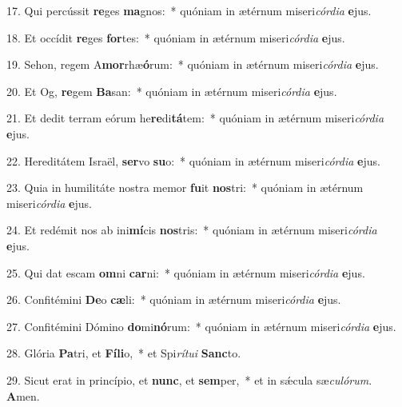 17. Qui percússit \textbf{re}ges \textbf{ma}gnos:~*  quóniam in ætérnum miseri\textit{cór}\textit{di}\textit{a} \textbf{e}jus.\

18. Et occídit \textbf{re}ges \textbf{for}tes:~*  quóniam in ætérnum miseri\textit{cór}\textit{di}\textit{a} \textbf{e}jus.\

19. Sehon, regem A\textbf{mor}rhæ\textbf{ó}rum:~*  quóniam in ætérnum miseri\textit{cór}\textit{di}\textit{a} \textbf{e}jus.\

20. Et Og, \textbf{re}gem \textbf{Ba}san:~*  quóniam in ætérnum miseri\textit{cór}\textit{di}\textit{a} \textbf{e}jus.\

21. Et dedit terram eórum he\textbf{re}di\textbf{tá}tem:~*  quóniam in ætérnum miseri\textit{cór}\textit{di}\textit{a} \textbf{e}jus.\

22. Hereditátem Israël, \textbf{ser}vo \textbf{su}o:~*  quóniam in ætérnum miseri\textit{cór}\textit{di}\textit{a} \textbf{e}jus.\

23. Quia in humilitáte nostra memor \textbf{fu}it \textbf{nos}tri:~*  quóniam in ætérnum miseri\textit{cór}\textit{di}\textit{a} \textbf{e}jus.\

24. Et redémit nos ab ini\textbf{mí}cis \textbf{nos}tris:~*  quóniam in ætérnum miseri\textit{cór}\textit{di}\textit{a} \textbf{e}jus.\

25. Qui dat escam \textbf{om}ni \textbf{car}ni:~*  quóniam in ætérnum miseri\textit{cór}\textit{di}\textit{a} \textbf{e}jus.\

26. Confitémini \textbf{De}o \textbf{cæ}li:~*  quóniam in ætérnum miseri\textit{cór}\textit{di}\textit{a} \textbf{e}jus.\

27. Confitémini Dómino \textbf{do}mi\textbf{nó}rum:~*  quóniam in ætérnum miseri\textit{cór}\textit{di}\textit{a} \textbf{e}jus.\

28. Glória \textbf{Pa}tri, et \textbf{Fí}\textbf{li}o,~*  et Spi\textit{rí}\textit{tu}\textit{i} \textbf{Sanc}to.\

29. Sicut erat in princípio, et \textbf{nunc}, et \textbf{sem}per,~*  et in sǽcula sæ\textit{cu}\textit{ló}\textit{rum}. \textbf{A}men.\

